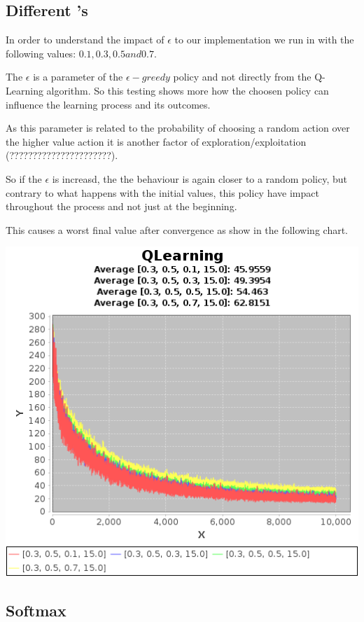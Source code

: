 \documentclass{article}
\begin{document}
\subsection{Different \epsilon's}
In order to understand the impact of $\epsilon$ to our implementation we run
in with the following values:
$0.1, 0.3, 0.5 and 0.7$.

The $\epsilon$ is a parameter of the $\epsilon-greedy$ policy and not directly
from the Q-Learning algorithm. So this testing shows more how the choosen policy can
influence the learning process and its outcomes. 

As this parameter is related to the probability of choosing a random action over
the higher value action it is another factor of exploration/exploitation
(??????????????????????).

So if the $\epsilon$ is increasd, the the behaviour is again closer to a random
policy, but contrary to what happens with the initial values, this policy have
impact throughout the process and not just at the beginning.

This causes a worst final value after convergence as show in the following
chart.

\includegraphics[]{res/alpha_03_gama_05_epsilon_01_to_07_IV_15.png}

\subsection{Softmax}
\label{softmax}
\end{document}
